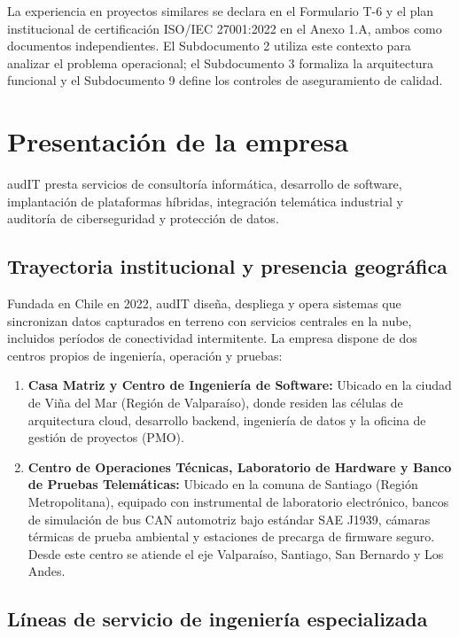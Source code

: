 La experiencia en proyectos similares se declara en el Formulario T-6 y el plan institucional de certificación ISO/IEC 27001:2022 en el Anexo 1.A, ambos como documentos independientes. El Subdocumento 2 utiliza este contexto para analizar el problema operacional; el Subdocumento 3 formaliza la arquitectura funcional y el Subdocumento 9 define los controles de aseguramiento de calidad.

\section{Presentación de la empresa}\label{sec:1-presentacion}

audIT presta servicios de consultoría informática, desarrollo de software, implantación de plataformas híbridas, integración telemática industrial y auditoría de ciberseguridad y protección de datos.

\subsection{Trayectoria institucional y presencia geográfica}\label{sec:1-trayectoria}

Fundada en Chile en 2022, audIT diseña, despliega y opera sistemas que sincronizan datos capturados en terreno con servicios centrales en la nube, incluidos períodos de conectividad intermitente. La empresa dispone de dos centros propios de ingeniería, operación y pruebas:

\begin{enumerate}
  \item \textbf{Casa Matriz y Centro de Ingeniería de Software:} Ubicado en la ciudad de Viña del Mar (Región de Valparaíso), donde residen las células de arquitectura cloud, desarrollo backend, ingeniería de datos y la oficina de gestión de proyectos (PMO).
  \item \textbf{Centro de Operaciones Técnicas, Laboratorio de Hardware y Banco de Pruebas Telemáticas:} Ubicado en la comuna de Santiago (Región Metropolitana), equipado con instrumental de laboratorio electrónico, bancos de simulación de bus CAN automotriz bajo estándar SAE J1939, cámaras térmicas de prueba ambiental y estaciones de precarga de firmware seguro. Desde este centro se atiende el eje Valparaíso, Santiago, San Bernardo y Los Andes.
\end{enumerate}

\subsection{Líneas de servicio de ingeniería especializada}\label{sec:1-lineas-servicio}

